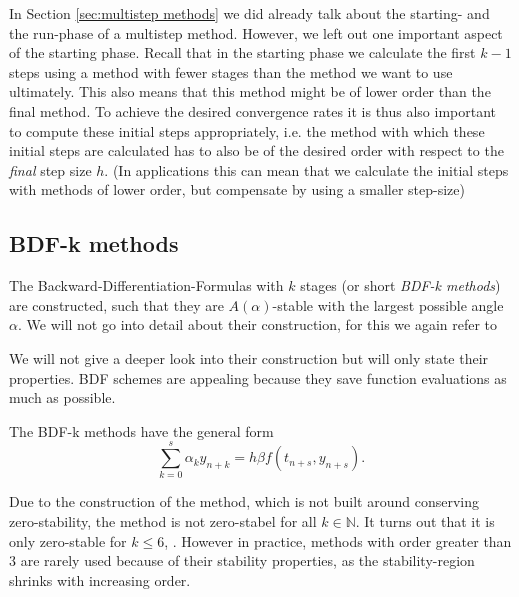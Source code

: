 In Section \ref{sec:multistep methods} we did already talk about the starting- and the run-phase of a multistep method. However, we left out one important aspect of the starting phase. Recall that in the starting phase we calculate the first $k-1$ steps using a method with fewer stages than the method we want to use ultimately. This also means that this method might be of lower order than the final method. To achieve the desired convergence rates it is thus also important to compute these initial steps appropriately, i.e. the method with which these initial steps are calculated has to also be of the desired order with respect to the \emph{final} step size $h$. (In applications this can mean that we calculate the initial steps with methods of lower order, but compensate by using a smaller step-size)

\subsection{BDF-k methods}
	\label{sec:BDFk}

	The Backward-Differentiation-Formulas with $k$ stages (or short \emph{BDF-k methods}) are constructed, such that they are $A(\alpha)$-stable with the largest possible angle $\alpha$. We will not go into detail about their construction, for this we again refer to 

	We will not give a deeper look into their construction but will only state their properties. BDF schemes are appealing because they save function evaluations as much as possible.
	
	The BDF-k methods have the general form
	\begin{equation}
		\sum_{k=0}^{s} \alpha_k y_{n+k} = h \beta f(t_{n+s}, y_{n+s}).
	\end{equation}

	Due to the construction of the method, which is not built around conserving zero-stability, the method is not zero-stabel for all $k \in \mathbb{N}$. It turns out that it is only zero-stable for $k \leq 6$, . However in practice, methods with order greater than $3$ are rarely used because of their stability properties, as the stability-region shrinks with increasing order.
	
